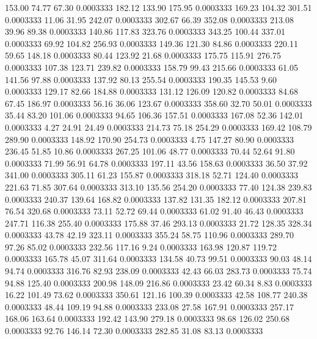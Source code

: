  153.00   74.77   67.30   0.0003333
 182.12  133.90  175.95   0.0003333
 169.23  104.32  301.51   0.0003333
  11.06   31.95  242.07   0.0003333
 302.67   66.39  352.08   0.0003333
 213.08   39.96   89.38   0.0003333
 140.86  117.83  323.76   0.0003333
 343.25  100.44  337.01   0.0003333
  69.92  104.82  256.93   0.0003333
 149.36  121.30   84.86   0.0003333
 220.11   59.65  148.18   0.0003333
  80.44  123.92   21.68   0.0003333
 175.75  115.91  276.75   0.0003333
 107.38  123.71  239.82   0.0003333
 158.79   99.43  215.66   0.0003333
  61.05  141.56   97.88   0.0003333
 137.92   80.13  255.54   0.0003333
 190.35  145.53    9.60   0.0003333
 129.17   82.66  184.88   0.0003333
 131.12  126.09  120.82   0.0003333
  84.68   67.45  186.97   0.0003333
  56.16   36.06  123.67   0.0003333
 358.60   32.70   50.01   0.0003333
  35.44   83.20  101.06   0.0003333
  94.65  106.36  157.51   0.0003333
 167.08   52.36  142.01   0.0003333
   4.27   24.91   24.49   0.0003333
 214.73   75.18  254.29   0.0003333
 169.42  108.79  289.90   0.0003333
 148.92  170.90  254.73   0.0003333
   4.75  147.27   80.90   0.0003333
 236.45   51.85   10.86   0.0003333
 267.25  101.06   48.77   0.0003333
  70.44   52.64   91.80   0.0003333
  71.99   56.91   64.78   0.0003333
 197.11   43.56  158.63   0.0003333
  36.50   37.92  341.00   0.0003333
 305.11   61.23  155.87   0.0003333
 318.18   52.71  124.40   0.0003333
 221.63   71.85  307.64   0.0003333
 313.10  135.56  254.20   0.0003333
  77.40  124.38  239.83   0.0003333
 240.37  139.64  168.82   0.0003333
 137.82  131.35  182.12   0.0003333
 207.81   76.54  320.68   0.0003333
  73.11   52.72   69.44   0.0003333
  61.02   91.40   46.43   0.0003333
 247.71  116.38  255.40   0.0003333
 175.88   37.46  293.13   0.0003333
  21.72  128.35  328.34   0.0003333
  43.78   42.19  323.11   0.0003333
 355.24   58.75  110.96   0.0003333
 289.70   97.26   85.02   0.0003333
 232.56  117.16    9.24   0.0003333
 163.98  120.87  119.72   0.0003333
 165.78   45.07  311.64   0.0003333
 134.58   40.73   99.51   0.0003333
  90.03   48.14   94.74   0.0003333
 316.76   82.93  238.09   0.0003333
  42.43   66.03  283.73   0.0003333
  75.74   94.88  125.40   0.0003333
 200.98  148.09  216.86   0.0003333
  23.42   60.34    8.83   0.0003333
  16.22  101.49   73.62   0.0003333
 350.61  121.16  100.39   0.0003333
  42.58  108.77  240.38   0.0003333
  48.44  109.19   94.88   0.0003333
 233.08   27.58  167.91   0.0003333
 257.17  168.06  163.64   0.0003333
 192.42  143.90  279.18   0.0003333
  98.68  126.02  250.68   0.0003333
  92.76  146.14   72.30   0.0003333
 282.85   31.08   83.13   0.0003333
